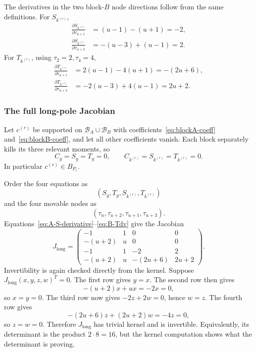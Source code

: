\documentclass[11pt]{article}
\theoremstyle{definition}
\begin{document}
The derivatives in the two block-$B$ node directions follow from the same definitions.  For $S_{k^{(r)}}$,
\begin{align}
\frac{\partial S_{k^{(r)}}}{\partial\tau_{u+1}}
&=(u-1)-(u+1)=-2,\label{eq:B-Sdu}\\
\frac{\partial S_{k^{(r)}}}{\partial\tau_{u+3}}
&=-(u-3)+(u-1)=2.\label{eq:B-Sdv}
\end{align}
For $T_{k^{(r)}}$, using $\tau_2=2,\tau_4=4$,
\begin{align}
\frac{\partial T_{k^{(r)}}}{\partial\tau_{u+1}}
&=2(u-1)-4(u+1)=-(2u+6),\label{eq:B-Tdu}\\
\frac{\partial T_{k^{(r)}}}{\partial\tau_{u+3}}
&=-2(u-3)+4(u-1)=2u+2.\label{eq:B-Tdv}
\end{align}

\subsubsection{The full long-pole Jacobian}

Let $c^{(r)}$ be supported on $\mathcal B_A\cup\mathcal B_B$ with coefficients~\eqref{eq:blockA-coeff} and~\eqref{eq:blockB-coeff}, and let all other coefficients vanish.  Each block separately kills its three relevant moments, so
\[
C_g=S_g=T_g=0,
\qquad
C_{k^{(r)}}=S_{k^{(r)}}=T_{k^{(r)}}=0.
\]
In particular $c^{(r)}\in B_{P_r}$.

Order the four equations as
\[
(S_g,T_g,S_{k^{(r)}},T_{k^{(r)}})
\]
and the four movable nodes as
\[
(\tau_u,\tau_{u+2},\tau_{u+1},\tau_{u+3}).
\]
Equations~\eqref{eq:A-S-derivative}--\eqref{eq:B-Tdv} give the Jacobian
\begin{equation}
J_{\mathrm{long}}
=
\begin{pmatrix}
-1&1&0&0\\
-(u+2)&u&0&0\\
-1&1&-2&2\\
-(u+2)&u&-(2u+6)&2u+2
\end{pmatrix}.
\label{eq:J-long}
\end{equation}
Invertibility is again checked directly from the kernel.  Suppose $J_{\mathrm{long}}(x,y,z,w)^T=0$.  The first row gives $y=x$.  The second row then gives
\[
-(u+2)x+ux=-2x=0,
\]
so $x=y=0$.  The third row now gives $-2z+2w=0$, hence $w=z$.  The fourth row gives
\[
-(2u+6)z+(2u+2)w=-4z=0,
\]
so $z=w=0$.  Therefore $J_{\mathrm{long}}$ has trivial kernel and is invertible.  Equivalently, its determinant is the product $2\cdot8=16$, but the kernel computation shows what the determinant is proving.
\end{document}
